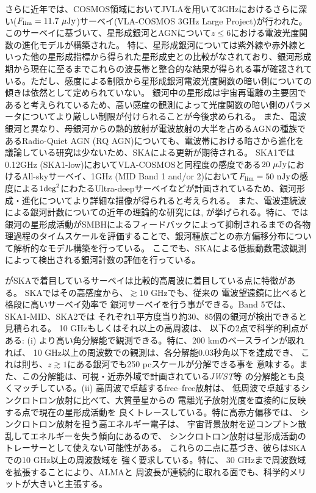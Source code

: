 \color{red}
さらに近年では、COSMOS領域においてJVLAを用いて3GHzにおけるさらに深い($F_{\rm lim}=11.7 {\rm \ \mu Jy}$)サーベイ(VLA-COSMOS 3GHz Large Project)が行われた\cite{2017A&A....602...A1}。
このサーベイに基づいて、星形成銀河とAGNについて$z \leq 6$における電波光度関数の進化モデルが構築された\citep[e.g., ][]{2017A&A....602...A6, 2017A&A....602...A5, 2018A&A....614...47N}。
特に、星形成銀河については紫外線や赤外線といった他の星形成指標から得られた星形成史との比較がなされており、銀河形成期から現在に至るまでこれらの波長帯と整合的な結果が得られる事が確認されている。ただし、感度による制限から星形成銀河電波光度関数の暗い側についての傾きは依然として定められていない。
銀河中の星形成は宇宙再電離の主要因であると考えられている\citep[e.g., ][]{2016MNRAS....463...1968Y}ため、高い感度の観測によって光度関数の暗い側のパラメータについてより厳しい制限が付けられることが今後求められる。
また、電波銀河と異なり、母銀河からの熱的放射が電波放射の大半を占めるAGNの種族であるRadio-Quiet AGN (RQ AGN)についても、電波帯における暗さから進化を議論している研究は少ない\citep[e.g., ][]{2011ApJ...740...20P, 2015MNRAS...452...1263P}ため、SKAによる更新が期待される。
SKA1では0.12GHz (SKA1-low)においてVLA-COSMOSと同程度の感度である$20\ {\rm \mu Jy}$におけるAll-skyサーベイ、1GHz (MID Band 1 and/or 2)において$F_{\rm lim}=50 {\rm \ nJy}$の感度による$1 {\rm deg}^2$にわたるUltra-deepサーベイなどが計画されている\cite{prandoni15}ため、銀河形成・進化についてより詳細な描像が得られると考えられる。
また、電波連続波による銀河計数についての近年の理論的な研究には\cite{2017ApJ....842...95}, \cite{2017MNRAS...469...4083S}が挙げられる。特に、\cite{2017ApJ....842...95}では銀河の星形成活動がSMBHによるフィードバックによって抑制されるまでの各物理過程のタイムスケールを評価することで、銀河種族ごとの赤方偏移分布について解析的なモデル構築を行っている。
ここでも、SKAによる低振動数電波観測によって検出される銀河計数の評価を行っている。
\color{black}


\citet{murphy15}がSKAで着目しているサーベイは比較的高周波に着目している点に特徴がある。
SKAではその高感度から、$\gtrsim 10$ GHzでも、従来の
電波望遠鏡に比べると格段に高いサーベイ効率で
銀河サーベイを行う事ができる。Band 5では、SKA1-MID、SKA2では
それぞれ1平方度当り約30、85個の銀河が検出できると見積られる。
10 GHzもしくはそれ以上の高周波は、
以下の2点で科学的利点がある: (i)
より高い角分解能で観測できる。特に、200 kmのベースラインが取れれば、
10 GHz以上の周波数での観測は、各分解能0.03秒角以下を達成でき、
これは則ち、$z\gtrsim 1$にある銀河でも250 pcスケールが分解できる事を
意味する。また、この分解能は、可視・近赤外域で計画されている\textit{JWST}等
の分解能とも良くマッチしている。(ii) 高周波で卓越するfree--free放射は、
低周波で卓越するシンクロトロン放射に比べて、大質量星からの
電離光子放射光度を直接的に反映する点で現在の星形成活動を
良くトレースしている。特に高赤方偏移では、
シンクロトロン放射を担う高エネルギー電子は、
宇宙背景放射を逆コンプトン散乱してエネルギーを失う傾向にあるので、
シンクロトロン放射は星形成活動のトレーサーとして使えない可能性がある。
これらの二点に基づき、彼らはSKAでの10 GHz以上の周波数域を
強く要求している。特に、
30 GHzまで周波数域を拡張することにより、ALMAと
周波長が連続的に取れる面でも、科学的メリットが大きいと主張する。

